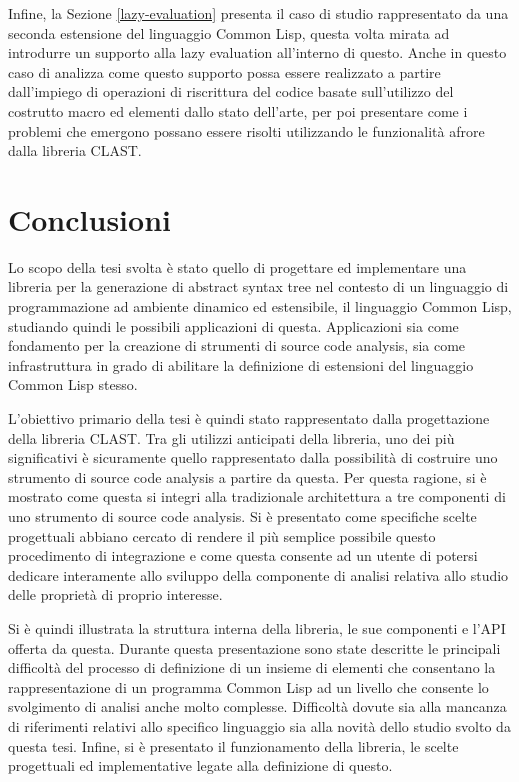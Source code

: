 \documentclass{book}
\begin{document}
Infine, la Sezione \ref{lazy-evaluation} presenta il caso di studio
rappresentato da una seconda estensione del linguaggio Common Lisp, questa volta
mirata ad introdurre un supporto alla lazy evaluation all’interno di questo.
Anche in questo caso di analizza come questo supporto possa essere realizzato a
partire dall’impiego di operazioni di riscrittura del codice basate
sull’utilizzo del costrutto macro ed elementi dallo stato dell’arte, per poi
presentare come i problemi che emergono possano essere risolti utilizzando le
funzionalità afrore dalla libreria CLAST.





\endgroup

\chapter{Conclusioni}

Lo scopo della tesi svolta è stato quello di progettare ed implementare una
libreria per la generazione di abstract syntax tree nel contesto di un
linguaggio di programmazione ad ambiente dinamico ed estensibile, il linguaggio
Common Lisp, studiando quindi le possibili applicazioni di questa. Applicazioni
sia come fondamento per la creazione di strumenti di source code analysis, sia
come infrastruttura in grado di abilitare la definizione di estensioni del
linguaggio Common Lisp stesso.

L'obiettivo primario della tesi è quindi stato rappresentato dalla progettazione
della libreria CLAST. Tra gli utilizzi anticipati della libreria, uno dei più
significativi è sicuramente quello rappresentato dalla possibilità di costruire
uno strumento di source code analysis a partire da questa. Per questa ragione,
si è mostrato come questa si integri alla tradizionale architettura a tre
componenti di uno strumento di source code analysis. Si è presentato come
specifiche scelte progettuali abbiano cercato di rendere il più semplice
possibile questo procedimento di integrazione e come questa consente ad un
utente di potersi dedicare interamente allo sviluppo della componente di analisi
relativa allo studio delle proprietà di proprio interesse.

Si è quindi illustrata la struttura interna della libreria, le sue componenti e
l'API offerta da questa. Durante questa presentazione sono state descritte le
principali difficoltà del processo di definizione di un insieme di elementi che
consentano la rappresentazione di un programma Common Lisp ad un livello che
consente lo svolgimento di analisi anche molto complesse. Difficoltà dovute sia
alla mancanza di riferimenti relativi allo specifico linguaggio sia alla novità
dello studio svolto da questa tesi. Infine, si è presentato il funzionamento
della libreria, le scelte progettuali ed implementative legate alla definizione
di questo.
\end{document}
